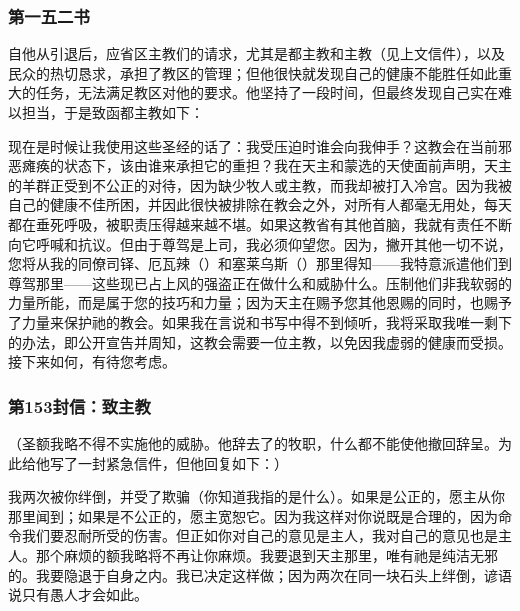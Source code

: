 
\subsubsection{第一五二书}

自他从引退后，应省区主教们的请求，尤其是都主教和主教（见上文信件），以及民众的热切恳求，承担了教区的管理；但他很快就发现自己的健康不能胜任如此重大的任务，无法满足教区对他的要求。他坚持了一段时间，但最终发现自己实在难以担当，于是致函都主教如下：\par

现在是时候让我使用这些圣经的话了：我受压迫时谁会向我伸手？这教会在当前邪恶瘫痪的状态下，该由谁来承担它的重担？我在天主和蒙选的天使面前声明，天主的羊群正受到不公正的对待，因为缺少牧人或主教，而我却被打入冷宫。因为我被自己的健康不佳所困，并因此很快被排除在教会之外，对所有人都毫无用处，每天都在垂死呼吸，被职责压得越来越不堪。如果这教省有其他首脑，我就有责任不断向它呼喊和抗议。但由于尊驾是上司，我必须仰望您。因为，撇开其他一切不说，您将从我的同僚司铎、厄瓦辣（）和塞莱乌斯（）那里得知——我特意派遣他们到尊驾那里——这些现已占上风的强盗正在做什么和威胁什么。压制他们非我软弱的力量所能，而是属于您的技巧和力量；因为天主在赐予您其他恩赐的同时，也赐予了力量来保护祂的教会。如果我在言说和书写中得不到倾听，我将采取我唯一剩下的办法，即公开宣告并周知，这教会需要一位主教，以免因我虚弱的健康而受损。接下来如何，有待您考虑。\par


\subsubsection{第153封信：致主教}

（圣额我略不得不实施他的威胁。他辞去了的牧职，什么都不能使他撤回辞呈。为此给他写了一封紧急信件，但他回复如下：）\par

我两次被你绊倒，并受了欺骗（你知道我指的是什么）。如果是公正的，愿主从你那里闻到；如果是不公正的，愿主宽恕它。因为我这样对你说既是合理的，因为命令我们要忍耐所受的伤害。但正如你对自己的意见是主人，我对自己的意见也是主人。那个麻烦的额我略将不再让你麻烦。我要退到天主那里，唯有祂是纯洁无邪的。我要隐退于自身之内。我已决定这样做；因为两次在同一块石头上绊倒，谚语说只有愚人才会如此。\par


